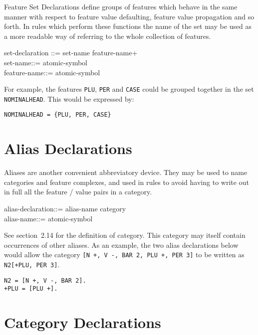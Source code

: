 Feature Set Declarations define groups of features which behave in the same
manner with respect to feature value defaulting, feature value propagation
and so forth. In rules which perform these functions the name of the set may be
used as a more readable way of referring to the whole collection of
features.
\begin{display}
\la set-declaration \ra ::= \la set-name\ra \lit{=} \lit{\{} \la feature-name\ran+ \lit{\}}\\
\la set-name\ra ::= \la atomic-symbol\ra\\
\la feature-name\ra ::= \la atomic-symbol\ra
\end{display}
For example, the features {\tt PLU}, {\tt PER} and {\tt CASE} could be grouped
together in the set {\tt NOMINALHEAD}. This would be expressed by:
\begin{ex}
\begin{verbatim}
NOMINALHEAD = {PLU, PER, CASE}
\end{verbatim}
\end{ex}

\section{Alias Declarations}

Aliases are another convenient abbreviatory device. They may be used to name
categories and feature complexes, and used in rules to avoid having to
write out in full all the feature / value pairs in a category.
\begin{display}
\la alias-declaration\ra ::= \la alias-name\ra \lit{=} \la category\ra {}\\
\la alias-name\ra ::= \la atomic-symbol\ra
\end{display}
See section~2.14 for the definition of \la category\ran. This category may
itself contain occurrences of other aliases. As an example, the
two alias declarations below would allow the category {\tt [N +, V -, BAR 2, PLU +,
PER 3]} to be written as {\tt N2[+PLU, PER 3]}.
\begin{ex}
\begin{verbatim}
N2 = [N +, V -, BAR 2].
+PLU = [PLU +].
\end{verbatim}
\end{ex}

\section{Category Declarations}


